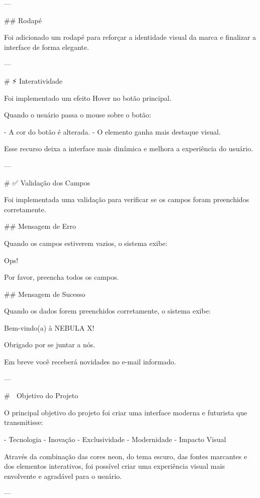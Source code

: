 ---

## Rodapé

Foi adicionado um rodapé para reforçar a identidade visual da marca e finalizar a interface de forma elegante.

---

# ⚡ Interatividade

Foi implementado um efeito Hover no botão principal.

Quando o usuário passa o mouse sobre o botão:

- A cor do botão é alterada.
- O elemento ganha mais destaque visual.

Esse recurso deixa a interface mais dinâmica e melhora a experiência do usuário.

---

# ✅ Validação dos Campos

Foi implementada uma validação para verificar se os campos foram preenchidos corretamente.

## Mensagem de Erro

Quando os campos estiverem vazios, o sistema exibe:

Ops!

Por favor, preencha todos os campos.

## Mensagem de Sucesso

Quando os dados forem preenchidos corretamente, o sistema exibe:

Bem-vindo(a) à NEBULA X!

Obrigado por se juntar a nós.

Em breve você receberá novidades no e-mail informado.

---

# 🎯 Objetivo do Projeto

O principal objetivo do projeto foi criar uma interface moderna e futurista que transmitisse:

- Tecnologia
- Inovação
- Exclusividade
- Modernidade
- Impacto Visual

Através da combinação das cores neon, do tema escuro, das fontes marcantes e dos elementos interativos, foi possível criar uma experiência visual mais envolvente e agradável para o usuário.

---

